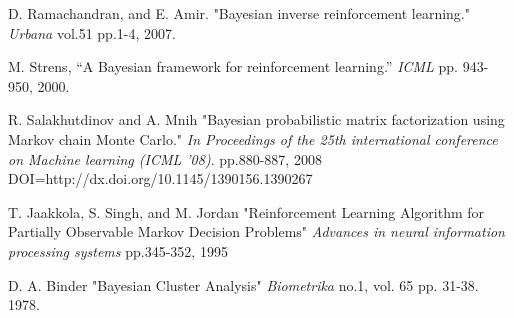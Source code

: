 \documentclass[a4paper]{article}
\begin{document}
\begin{thebibliography}{9}
    D. Ramachandran, and E. Amir. "Bayesian inverse reinforcement 
    learning." \textit{Urbana}  vol.51 pp.1-4, 2007. 

    M. Strens, “A Bayesian framework for reinforcement learning.” 
    \textit{ICML} pp. 943-950, 2000. 

    R. Salakhutdinov and A. Mnih "Bayesian probabilistic matrix factorization 
    using Markov chain Monte Carlo." \textit{In Proceedings of the 25th 
    international conference on Machine learning (ICML '08)}. 
    pp.880-887, 2008 DOI=http://dx.doi.org/10.1145/1390156.1390267

    T. Jaakkola, S. Singh, and M. Jordan "Reinforcement Learning 
    Algorithm for Partially Observable Markov Decision Problems" 
    \textit{ Advances in neural information processing systems}
    pp.345-352, 1995

    D. A. Binder "Bayesian Cluster Analysis" 
    \textit{Biometrika} no.1, vol. 65 pp. 31-38. 1978.



\end{thebibliography}
\end{document}
